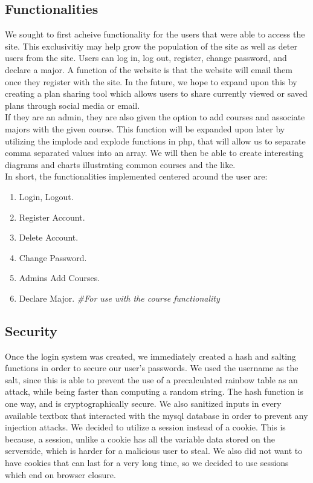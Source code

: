 \documentclass{article}
\begin{document}
\begin{doublespace}
\subsection*{Functionalities}
\indent We sought to first acheive functionality for the users that were able to access the site. This exclusivitiy may help grow the population of the site as well as deter users from the site. Users can log in, log out, register, change password, and declare a major. A function of the website is that the website will email them once they register with the site. In the future, we hope to expand upon this by creating a plan sharing tool which allows users to share currently viewed or saved plans through social media or email. \\
\indent If they are an admin, they are also given the option to add courses and associate majors with the given course. This function will be expanded upon later by utilizing the implode and explode functions in php, that will allow us to separate comma separated values into an array. We will then be able to create interesting diagrams and charts illustrating common courses and the like.\\

\indent In short, the functionalities implemented centered around the user are:
\begin{enumerate}
\item Login, Logout.
\item Register Account.
\item Delete Account.
\item Change Password.
\item Admins Add Courses.
\item Declare Major. \emph{\#For use with the course functionality}
\end{enumerate}

\subsection*{Security}
\indent Once the login system was created, we immediately created a hash and salting functions in order to secure our user's passwords. We used the username as the salt, since this is able to prevent the use of a precalculated rainbow table as an attack, while being faster than computing a random string. The hash function is one way, and is cryptographically secure. We also sanitized inputs in every available textbox that interacted with the mysql database in order to prevent any injection attacks. We decided to utilize a session instead of a cookie. This is because, a session, unlike a cookie has all the variable data stored on the serverside, which is harder for a malicious user to steal. We also did not want to have cookies that can last for a very long time, so we decided to use sessions which end on browser closure.


\end{doublespace}
\end{document}
